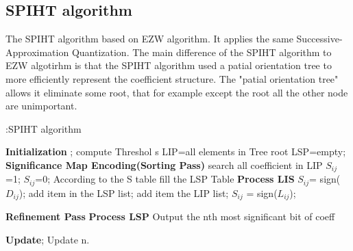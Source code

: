 \documentclass[twocolumn]{article}  %
\begin{document}
\subsection {SPIHT algorithm}
The SPIHT algorithm based on EZW algorithm. It applies the same Successive-Approximation Quantization. The main difference of the SPIHT algorithm to EZW algotirhm is that the SPIHT algorithm used a patial orientation tree to more efficiently represent the coefficient structure. The "patial orientation tree" allows it eliminate some root, that for example except the root all the other node are unimportant. 
\begin{algorithm}[t]  
  \caption{:SPIHT algorithm}
	\begin{algorithmic}
	\State \textbf{Initialization} ;
	\State compute Threshol s
	\State LIP=all elements in Tree root
	\State LSP=empty;
	\State \textbf{Significance Map Encoding(Sorting Pass)}
	\State search all coefficient in LIP
		\State $S_{ij}$=1;
	\Else
		\State $S_{ij}$=0;
	\EndIf
	\State According to the S table fill the LSP Table	
	\EndFor	
	\State \textbf{Process LIS}
		\State $S_{ij}$= sign($D_{ij}$);
			\State add item in the LSP list;
		\Else 
			\State add item the LIP list;
		\EndIf
		\State  $S_{ij}$ = sign($L_{ij}$);

	\EndIf
	\EndFor 
	\State\textbf{Refinement Pass}
	\State \textbf{Process LSP}
		\State Output the nth most significant bit of coeff
	\EndFor
	
	\State\textbf{Update};
	\State Update n.
    	\EndFor
	\end{algorithmic}
\end{algorithm} 

 
\end{document}
